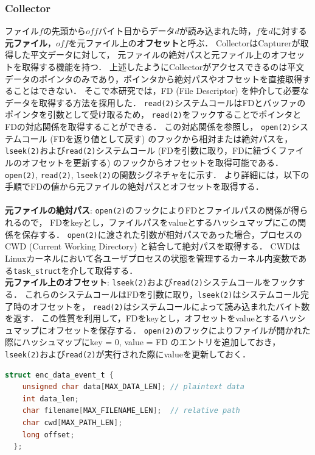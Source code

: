 \subsubsection{Collector}
ファイル$f$の先頭から$off$バイト目からデータ$d$が読み込まれた時，$f$を$d$に対する\textbf{元ファイル}，$off$を元ファイル上の\textbf{オフセット}と呼ぶ．
CollectorはCapturerが取得した平文データに対して，
元ファイルの絶対パスと元ファイル上のオフセットを取得する機能を持つ．
上述したようにCollectorがアクセスできるのは平文データのポインタのみであり，ポインタから絶対パスやオフセットを直接取得することはできない．
そこで本研究では，FD (File Descriptor) を仲介して必要なデータを取得する方法を採用した．
\texttt{read(2)}システムコールはFDとバッファのポインタを引数として受け取るため，
\texttt{read(2)}をフックすることでポインタとFDの対応関係を取得することができる．
この対応関係を参照し，
\texttt{open(2)}システムコール (FDを返り値として戻す) のフックから相対または絶対パスを，
\texttt{lseek(2)}および\texttt{read(2)}システムコール (FDを引数に取り，FDに紐づくファイルのオフセットを更新する) のフックからオフセットを取得可能である．
\texttt{open(2)}, \texttt{read(2)}, \texttt{lseek(2)}の関数シグネチャをに示す．
より詳細には，以下の手順でFDの値から元ファイルの絶対パスとオフセットを取得する．
\\
\\
\textbf{元ファイルの絶対パス}:
\texttt{open(2)}のフックによりFDとファイルパスの関係が得られるので，
FDをkeyとし，ファイルパスをvalueとするハッシュマップにこの関係を保存する．
\texttt{open(2)}に渡された引数が相対パスであった場合，プロセスのCWD (Current Working Directory) と結合して絶対パスを取得する．
CWDはLinuxカーネルにおいて各ユーザプロセスの状態を管理するカーネル内変数である\texttt{task\_struct}を介して取得する．
\\
\textbf{元ファイル上のオフセット}:
\texttt{lseek(2)}および\texttt{read(2)}システムコールをフックする．
これらのシステムコールはFDを引数に取り，\texttt{lseek(2)}はシステムコール完了時のオフセットを，
\texttt{read(2)}はシステムコールによって読み込まれたバイト数を返す．
この性質を利用して，FDをkeyとし，オフセットをvalueとするハッシュマップにオフセットを保存する．
\texttt{open(2)}のフックによりファイルが開かれた際にハッシュマップにkey = 0, value = FD のエントリを追加しておき，
\texttt{lseek(2)}および\texttt{read(2)}が実行された際にvalueを更新しておく．

\begin{lstlisting}[caption=Data structure that represents data encryption by a user process., label=code:enc_data_event, language=C]
  struct enc_data_event_t {
    unsigned char data[MAX_DATA_LEN]; // plaintext data
    int data_len;                     
    char filename[MAX_FILENAME_LEN];  // relative path
    char cwd[MAX_PATH_LEN]; 
    long offset;
  };
\end{lstlisting}

